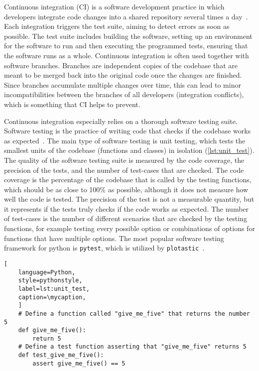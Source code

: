 Continuous integration (CI) is a software development practice in which
developers integrate code changes into a shared repository several times
a day~\cite{duvall2007continuous}. Each integration triggers the test
suite, aiming to detect errors as soon as possible. The test suite
includes building the software, setting up an environment for the
software to run and then executing the programmed tests, ensuring that
the software runs as a whole. Continuous integration is often used
together with software branches. Branches are independent copies of the
codebase that are meant to be merged back into the original code once
the changes are finished. Since branches accumulate multiple changes
over time, this can lead to minor incompatibilities between the branches
of all developers (integration conflicts), which is something that CI
helps to prevent.

Continuous integration especially relies on a thorough software testing
suite. Software testing is the practice of writing code that checks if
the codebase works as expected~\cite{10.5555/2161638}. The main type of software testing is
unit testing, which tests the smallest units of the codebase (functions
and classes) in isolation (\autoref{lst:unit_test}). The quality of the
software testing suite is measured by the code coverage, the precision
of the tests, and the number of test-cases that are checked. The code
coverage is the percentage of the codebase that is called by the testing
functions, which should be as close to 100\% as possible, although it
does not measure how well the code is tested. The precision of the test
is not a measurable quantity, but it represents if the tests truly
checks if the code works as expected. The number of test-cases is the
number of different scenarios that are checked by the testing functions,
for example testing every possible option or combinations of options for
functions that have multiple options. The most popular software testing
framework for python is \texttt{pytest}, which is utilized by
\texttt{plotastic}~\cite{pytestx.y}.

\def\mycaption{ Example of an arbitrary python function and its
    respective unit test function. The first function simply returns the
    number 5. The second function tests if the first function indeed returns
    the number 5. The test function is named with the prefix
    ``\texttt{test\_}'' and is placed in a file that ends with the suffix
    ``\texttt{\_test.py}''. The test function is executed by the testing
    framework \texttt{pytest}.}
\begin{lstlisting}[
    language=Python, 
    style=pythonstyle,
    label=lst:unit_test, 
    caption=\mycaption,
    ]
    # Define a function called "give_me_five" that returns the number 5
    def give_me_five():
        return 5
    # Define a test function asserting that "give_me_five" returns 5
    def test_give_me_five():
        assert give_me_five() == 5 
\end{lstlisting}


